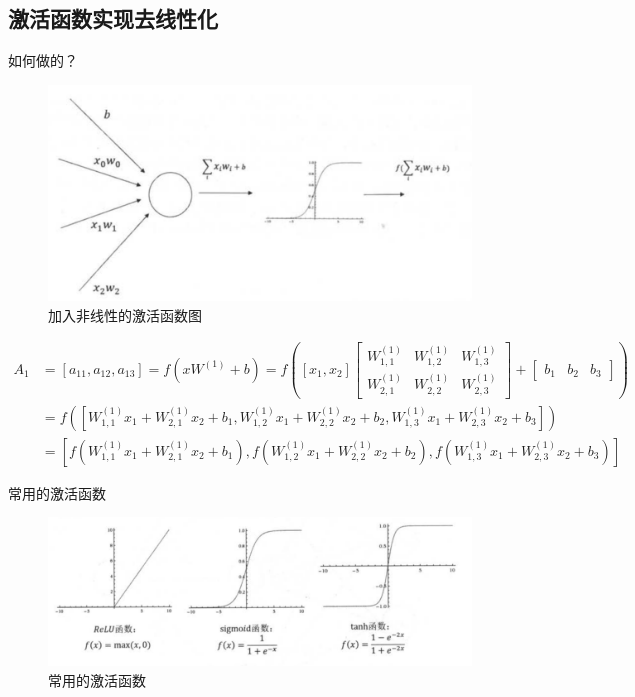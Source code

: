\documentclass{article}\usepackage{float}\usepackage{listings} \usepackage{braket} \usepackage{amsmath,amssymb} \usepackage{geometry} \usepackage{graphicx} \usepackage{fancyvrb}\usepackage{braket} \usepackage{bm}\usepackage{hyperref} \usepackage{CJKutf8} \geometry{left=0.2cm,right=0.2cm,top=0.2cm,bottom=0.2cm} \renewcommand{\theequation}{\arabic{section}.\arabic{equation}} \renewcommand{\baselinestretch}{1.5}
\begin{document}
\begin{CJK}{UTF8}{gbsn}
\subsection{激活函数实现去线性化}
\label{sec:org420e81a}

如何做的？

\begin{figure}[H]
  \centering \includegraphics[width=0.6\linewidth]{nonlinear.png}
  \caption{加入非线性的激活函数图}
\end{figure}

\begin{displaymath}
  \begin{aligned} A_{1} &=\left[a_{11}, a_{12}, a_{13}\right]=f\left(x W^{(1)}+b\right)=f\left(\left[x_{1}, x_{2}\right]\left[\begin{array}{ccc}{W_{1,1}^{(1)}} & {W_{1,2}^{(1)}} & {W_{1,3}^{(1)}} \\ {W_{2,1}^{(1)}} & {W_{2,2}^{(1)}} & {W_{2,3}^{(1)}}\end{array}\right]+\left[\begin{array}{lll}{b_{1}} & {b_{2}} & {b_{3}}\end{array}\right]\right) \\ &=f\left(\left[W_{1,1}^{(1)} x_{1}+W_{2,1}^{(1)} x_{2}+b_{1}, W_{1,2}^{(1)} x_{1}+W_{2,2}^{(1)} x_{2}+b_{2}, W_{1,3}^{(1)} x_{1}+W_{2,3}^{(1)} x_{2}+b_{3}\right]\right) \\ &=\left[f\left(W_{1,1}^{(1)} x_{1}+W_{2,1}^{(1)} x_{2}+b_{1}\right), f\left(W_{1,2}^{(1)} x_{1}+W_{2,2}^{(1)} x_{2}+b_{2}\right), f\left(W_{1,3}^{(1)} x_{1}+W_{2,3}^{(1)} x_{2}+b_{3}\right)\right] \end{aligned}
\end{displaymath}

常用的激活函数

\begin{figure}[htbp]
  \centering \includegraphics[width=0.8\linewidth]{act.png}
  \caption{常用的激活函数}
\end{figure}


\end{CJK}
\end{document}

